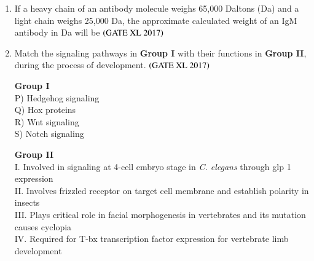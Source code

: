 \documentclass[journal]{IEEEtran}
\begin{document}
\begin{enumerate}
\item If a heavy chain of an antibody molecule weighs 65,000 Daltons (Da) and a light chain weighs 25,000 Da, the approximate calculated weight of an IgM antibody in Da will be \hfill $\left(\text{GATE XL 2017}\right)$
\begin{enumerate}
\end{enumerate}
\clearpage
\item Match the signaling pathways in \textbf{Group I} with their functions in \textbf{Group II}, during the process of development. \hfill $\left(\text{GATE XL 2017}\right)$

\begin{multicols}{2}
\noindent \textbf{Group I} \\
P) Hedgehog signaling \\
Q) Hox proteins \\
R) Wnt signaling \\
S) Notch signaling \\

\columnbreak

\noindent \textbf{Group II} \\
I. Involved in signaling at 4-cell embryo stage in \textit{C. elegans} through glp 1 expression \\
II. Involves frizzled receptor on target cell membrane and establish polarity in insects \\
III. Plays critical role in facial morphogenesis in vertebrates and its mutation causes cyclopia \\
IV. Required for T-bx transcription factor expression for vertebrate limb development \\
\end{multicols}

\begin{enumerate}
\end{enumerate}


\end{enumerate}
\end{document}
